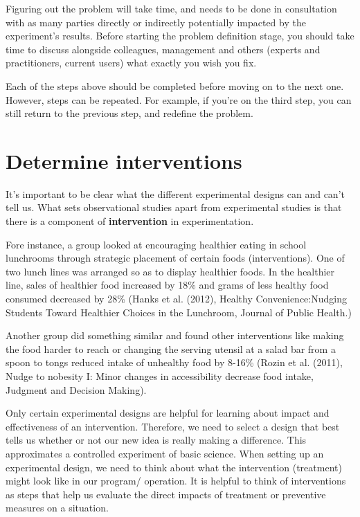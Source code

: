 \documentclass[openany]{book}
\begin{document}
Figuring out the problem will take time, and needs to be done in consultation with as many parties directly or indirectly potentially impacted by the experiment's results. Before starting the problem definition stage, you should take time to discuss alongside colleagues, management and others (experts and practitioners, current users) what exactly you wish you fix.

Each of the steps above should be completed before moving on to the next one. However, steps can be repeated. For example, if you're on the third step, you can still return to the previous step, and redefine the problem.

\hypertarget{determine-interventions}{%
\section{Determine interventions}\label{determine-interventions}}

It's important to be clear what the different experimental designs can and can't tell us. What sets observational studies apart from experimental studies is that there is a component of \textbf{intervention} in experimentation.

Fore instance, a group looked at encouraging healthier eating in school lunchrooms through strategic placement of certain foods (interventions). One of two lunch lines was arranged so as to display healthier foods. In the healthier line, sales of healthier food increased by 18\% and grams of less healthy food consumed decreased by 28\% (Hanks et al. (2012), Healthy Convenience:Nudging Students Toward Healthier Choices in the Lunchroom, Journal of Public Health.)

Another group did something similar and found other interventions like making the food harder to reach or changing the serving utensil at a salad bar from a spoon to tongs reduced intake of unhealthy food by 8-16\% (Rozin et al. (2011), Nudge to nobesity I: Minor changes in accessibility decrease food intake, Judgment and Decision Making).

Only certain experimental designs are helpful for learning about impact and effectiveness of an intervention. Therefore, we need to select a design that best tells us whether or not our new idea is really making a difference. This approximates a controlled experiment of basic science.
When setting up an experimental design, we need to think about what the intervention (treatment) might look like in our program/ operation. It is helpful to think of interventions as steps that help us evaluate the direct impacts of treatment or preventive measures on a situation.
\end{document}
